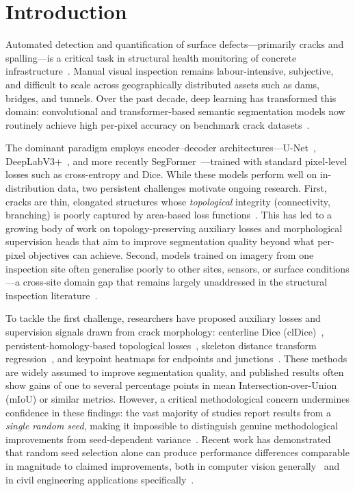\documentclass[preprint,12pt]{elsarticle}
\begin{document}
\section{Introduction}
\label{sec:introduction}

Automated detection and quantification of surface defects---primarily cracks and spalling---is a critical task in structural health monitoring of concrete infrastructure~\cite{koch2015review, mosalam2024dlshm}. Manual visual inspection remains labour-intensive, subjective, and difficult to scale across geographically distributed assets such as dams, bridges, and tunnels. Over the past decade, deep learning has transformed this domain: convolutional and transformer-based semantic segmentation models now routinely achieve high per-pixel accuracy on benchmark crack datasets~\cite{kulkarni2022crackseg9k, dorafshan2018sdnet, zhang2025crackreview}.

The dominant paradigm employs encoder--decoder architectures---U-Net~\cite{ronneberger2015unet}, DeepLabV3+~\cite{chen2018deeplabv3plus}, and more recently SegFormer~\cite{xie2021segformer}---trained with standard pixel-level losses such as cross-entropy and Dice. While these models perform well on in-distribution data, two persistent challenges motivate ongoing research. First, cracks are thin, elongated structures whose \emph{topological} integrity (connectivity, branching) is poorly captured by area-based loss functions~\cite{shit2021cldice, hu2019topology}. This has led to a growing body of work on topology-preserving auxiliary losses and morphological supervision heads that aim to improve segmentation quality beyond what per-pixel objectives can achieve. Second, models trained on imagery from one inspection site often generalise poorly to other sites, sensors, or surface conditions---a cross-site domain gap that remains largely unaddressed in the structural inspection literature~\cite{bukhsh2021damage, hassani2025dashm}.

To tackle the first challenge, researchers have proposed auxiliary losses and supervision signals drawn from crack morphology: centerline Dice (clDice)~\cite{shit2021cldice}, persistent-homology-based topological losses~\cite{clough2020topological, hu2019topology}, skeleton distance transform regression~\cite{audebert2019distance}, and keypoint heatmaps for endpoints and junctions~\cite{sun2019crackjunction}. These methods are widely assumed to improve segmentation quality, and published results often show gains of one to several percentage points in mean Intersection-over-Union (mIoU) or similar metrics. However, a critical methodological concern undermines confidence in these findings: the vast majority of studies report results from a \emph{single random seed}, making it impossible to distinguish genuine methodological improvements from seed-dependent variance~\cite{picard2021seed, henderson2018rl}. Recent work has demonstrated that random seed selection alone can produce performance differences comparable in magnitude to claimed improvements, both in computer vision generally~\cite{picard2021seed} and in civil engineering applications specifically~\cite{alsabbagh2024randomness}.
\end{document}
